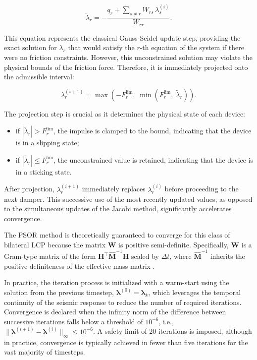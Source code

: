 \documentclass[preprint,12pt,authoryear]{elsarticle}
\begin{document}
\begin{equation}
	\tilde{\lambda}_r =
	-\frac{q_r + \displaystyle\sum_{s \neq r} W_{rs}\,\lambda_s^{(i)}}{W_{rr}}.
	\label{eq:gstep}
\end{equation}

This equation represents the classical Gauss-Seidel update step, providing the exact solution for $\lambda_r$ that would satisfy the $r$-th equation of the system if there were no friction constraints. However, this unconstrained solution may violate the physical bounds of the friction force. Therefore, it is immediately projected onto the admissible interval:

\begin{equation}
	\lambda_r^{(i+1)} = \max\!\left(-F^{\lim}_r,\;\min\!\left(F^{\lim}_r,\;
	\tilde{\lambda}_r\right)\right).
	\label{eq:psor}
\end{equation}

The projection step is crucial as it determines the physical state of each device:

\begin{itemize}
	\renewcommand{\labelitemi}{---}
	\item if $|\tilde{\lambda}_r| > F^{\lim}_r$, the impulse is clamped to the bound, indicating that the device is in a slipping state;
	\item if $|\tilde{\lambda}_r| \leq F^{\lim}_r$, the unconstrained value is retained, indicating that the device is in a sticking state.
\end{itemize}

After projection, $\lambda_r^{(i+1)}$ immediately replaces $\lambda_r^{(i)}$ before proceeding to the next damper. This successive use of the most recently updated values, as opposed to the simultaneous updates of the Jacobi method, significantly accelerates convergence.

The PSOR method is theoretically guaranteed to converge for this class of bilateral LCP because the matrix $\bm{W}$ is positive semi-definite. Specifically, $\bm{W}$ is a Gram-type matrix of the form $\bm{H}^{\top}\hat{\bm{M}}^{-1}\bm{H}$ scaled by $\Delta t$, where $\hat{\bm{M}}^{-1}$ inherits the positive definiteness of the effective mass matrix \citep{Namorado2022}.

In practice, the iteration process is initialized with a warm-start using the solution from the previous timestep, $\bm{\lambda}^{(0)} = \bm{\lambda}_k$, which leverages the temporal continuity of the seismic response to reduce the number of required iterations. Convergence is declared when the infinity norm of the difference between successive iterations falls below a threshold of $10^{-6}$, i.e., $\|\bm{\lambda}^{(i+1)} - \bm{\lambda}^{(i)}\|_\infty \leq 10^{-6}$. A safety limit of 20 iterations is imposed, although in practice, convergence is typically achieved in fewer than five iterations for the vast majority of timesteps.
\end{document}
